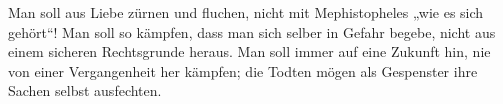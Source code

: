 Man soll aus Liebe zürnen und fluchen, nicht mit Mephistopheles „wie es sich gehört“! Man soll so kämpfen, dass man sich selber in Gefahr begebe, nicht aus einem sicheren Rechtsgrunde heraus. Man soll immer auf eine Zukunft hin, nie von einer Vergangenheit her kämpfen; die Todten mögen als Gespenster ihre Sachen selbst ausfechten.
\par

